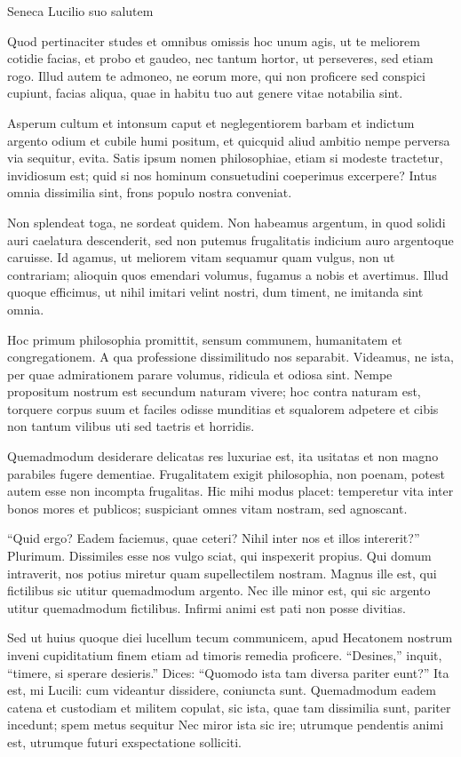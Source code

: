 {\large
\noindent Seneca Lucilio suo salutem

\medskip


\noindent Quod pertinaciter studes et omnibus omissis hoc unum agis, ut te meliorem cotidie facias, et probo et gaudeo, nec tantum hortor, ut perseveres, sed etiam rogo. Illud autem te admoneo, ne eorum more, qui non proficere sed conspici cupiunt, facias aliqua, quae in habitu tuo aut genere vitae notabilia sint. 

Asperum cultum et intonsum caput et neglegentiorem barbam et indictum argento odium et cubile humi positum, et quicquid aliud ambitio nempe perversa via sequitur, evita. Satis ipsum nomen philosophiae, etiam si modeste tractetur, invidiosum est; quid si nos hominum consuetudini coeperimus excerpere? Intus omnia dissimilia sint, frons populo nostra conveniat.

Non splendeat toga, ne sordeat quidem. Non habeamus argentum, in quod solidi auri caelatura descenderit, sed non putemus frugalitatis indicium auro argentoque caruisse. Id agamus, ut meliorem vitam sequamur quam vulgus, non ut contrariam; alioquin quos emendari volumus, fugamus a nobis et avertimus. Illud quoque efficimus, ut nihil imitari velint nostri, dum timent, ne imitanda sint omnia.

Hoc primum philosophia promittit, sensum communem, humanitatem et congregationem. A qua professione dissimilitudo nos separabit. Videamus, ne ista, per quae admirationem parare volumus, ridicula et odiosa sint. Nempe propositum nostrum est secundum naturam vivere; hoc contra naturam est, torquere corpus suum et faciles odisse munditias et squalorem adpetere et cibis non tantum vilibus uti sed taetris et horridis.

Quemadmodum desiderare delicatas res luxuriae est, ita usitatas et non magno parabiles fugere dementiae. Frugalitatem exigit philosophia, non poenam, potest autem esse non incompta frugalitas. Hic mihi modus placet: temperetur vita inter bonos mores et publicos; suspiciant omnes vitam nostram, sed agnoscant.

``Quid ergo? Eadem faciemus, quae ceteri? Nihil inter nos et illos intererit?'' Plurimum. Dissimiles esse nos vulgo sciat, qui inspexerit propius. Qui domum intraverit, nos potius miretur quam supellectilem nostram. Magnus ille est, qui fictilibus sic utitur quemadmodum argento. Nec ille minor est, qui sic argento utitur quemadmodum fictilibus. Infirmi animi est pati non posse divitias. 

Sed ut huius quoque diei lucellum tecum communicem, apud Hecatonem nostrum inveni cupiditatium finem etiam ad timoris remedia proficere. ``Desines,'' inquit, ``timere, si sperare desieris.'' Dices: ``Quomodo ista tam diversa pariter eunt?'' Ita est, mi Lucili: cum videantur dissidere, coniuncta sunt. Quemadmodum eadem catena et custodiam et militem copulat, sic ista, quae tam dissimilia sunt, pariter incedunt; spem metus sequitur Nec miror ista sic ire; utrumque pendentis animi est, utrumque futuri exspectatione solliciti.

}
